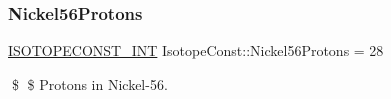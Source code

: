 \subsubsection{\texorpdfstring{Nickel56\+Protons}{Nickel56Protons}}
{\footnotesize\ttfamily \mbox{\hyperlink{group___isotope_const-_macros_ga5f18360b3e99483a35c32d789e62621c}{I\+S\+O\+T\+O\+P\+E\+C\+O\+N\+S\+T\+\_\+\+I\+NT}} Isotope\+Const\+::\+Nickel56\+Protons = 28}

\$ \$ Protons in Nickel-\/56. 